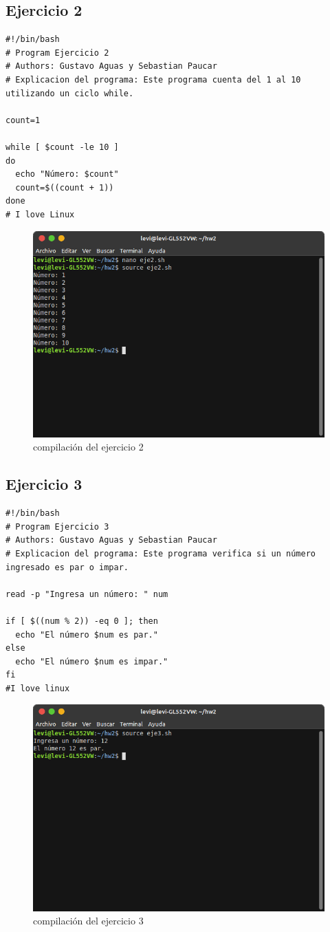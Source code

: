 \documentclass[11pt,twoside]{book}
\begin{document}
\newpage
\subsection{Ejercicio 2}
\begin{lstlisting}
#!/bin/bash
# Program Ejercicio 2
# Authors: Gustavo Aguas y Sebastian Paucar
# Explicacion del programa: Este programa cuenta del 1 al 10 utilizando un ciclo while.

count=1

while [ $count -le 10 ]
do
  echo "Número: $count"
  count=$((count + 1))
done
# I love Linux
\end{lstlisting}
\begin{figure}[h]
    \centering
    \includegraphics[width=0.8\linewidth]{Tarea2/teje2.png}
    \caption{ compilación del ejercicio 2}
\end{figure}
\newpage
\subsection{Ejercicio 3}
\begin{lstlisting}
#!/bin/bash
# Program Ejercicio 3
# Authors: Gustavo Aguas y Sebastian Paucar
# Explicacion del programa: Este programa verifica si un número ingresado es par o impar.

read -p "Ingresa un número: " num

if [ $((num % 2)) -eq 0 ]; then
  echo "El número $num es par."
else
  echo "El número $num es impar."
fi
#I love linux
\end{lstlisting}
\begin{figure}[h]
    \centering
    \includegraphics[width=0.8\linewidth]{Tarea2/teje32.png}
    \caption{ compilación del ejercicio 3}
\end{figure}
\newpage
\end{document}
